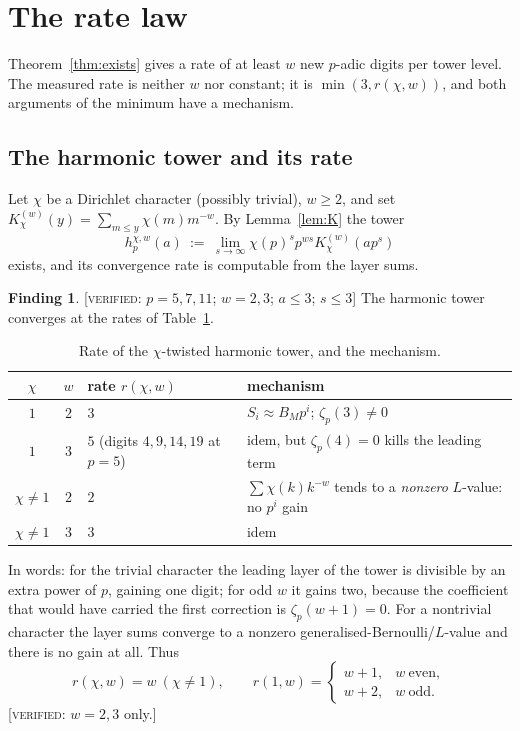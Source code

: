 \documentclass[11pt,reqno]{article}
\newcommand{\VER}[1]{{\normalfont\textsc{[verified:} #1\textsc{]}}}
\theoremstyle{plain}
\theoremstyle{definition}
\newtheorem{finding}[theorem]{Finding}
\theoremstyle{remark}
\numberwithin{equation}{section}
\begin{document}
\section{The rate law}\label{sec:rate}

Theorem~\ref{thm:exists} gives a rate of at least $w$ new $p$-adic digits per
tower level.  The measured rate is neither $w$ nor constant; it is
$\min(3,r(\chi,w))$, and both arguments of the minimum have a mechanism.

\subsection{The harmonic tower and its rate}\label{ss:harmrate}

Let $\chi$ be a Dirichlet character (possibly trivial), $w\ge2$, and set
$K^{(w)}_\chi(y)=\sum_{m\le y}\chi(m)m^{-w}$.  By Lemma~\ref{lem:K} the tower
\[
  h^{\chi,w}_p(a)\ :=\ \lim_{s\to\infty}\chi(p)^{s}p^{ws}K^{(w)}_\chi(ap^s)
\]
exists, and its convergence rate is computable from the layer sums.

\begin{finding}\label{find:harmrate}
\VER{$p=5,7,11$; $w=2,3$; $a\le3$; $s\le3$} The harmonic tower converges at the
rates of Table~\ref{tab:harmonicrate}.
\end{finding}

\begin{table}[h]
\centering\small
\caption{Rate of the $\chi$-twisted harmonic tower, and the mechanism.}
\label{tab:harmonicrate}
\begin{tabular}{@{}ccll@{}}
\toprule
$\chi$ & $w$ & rate $r(\chi,w)$ & mechanism\\
\midrule
$1$ & $2$ & $3$ & $S_i\approx B_Mp^{i}$; $\zeta_p(3)\ne0$\\
$1$ & $3$ & $5$ (digits $4,9,14,19$ at $p=5$) & idem, but $\zeta_p(4)=0$ kills the leading term\\
$\chi\ne1$ & $2$ & $2$ & $\sum\chi(k)k^{-w}$ tends to a \emph{nonzero} $L$-value: no $p^{i}$ gain\\
$\chi\ne1$ & $3$ & $3$ & idem\\
\bottomrule
\end{tabular}
\end{table}

In words: for the trivial character the leading layer of the tower is divisible
by an extra power of $p$, gaining one digit; for odd $w$ it gains two, because
the coefficient that would have carried the first correction is
$\zeta_p(w+1)=0$.  For a nontrivial character the layer sums converge to a
nonzero generalised-Bernoulli/$L$-value and there is no gain at all.  Thus
\[
  r(\chi,w)=w\ (\chi\ne1),\qquad
  r(1,w)=\begin{cases} w+1,& w\ \text{even},\\ w+2,& w\ \text{odd}.\end{cases}
\]
\VER{$w=2,3$ only.}
\end{document}
